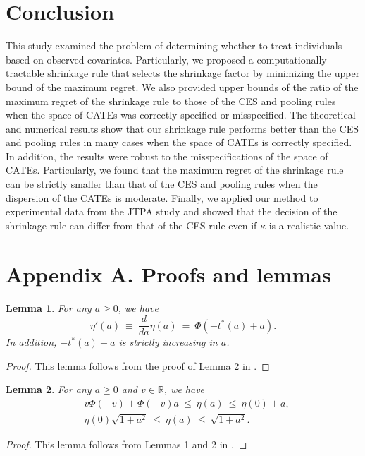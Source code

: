 \documentclass[12pt,a4paper]{article}
\newtheorem{Lemma}{Lemma}
\begin{document}
\section{Conclusion}\label{Sec:conclusion}
This study examined the problem of determining whether to treat individuals based on observed covariates. Particularly, we proposed a computationally tractable shrinkage rule that selects the shrinkage factor by minimizing the upper bound of the maximum regret. We also provided upper bounds of the ratio of the maximum regret of the shrinkage rule to those of the CES and pooling rules when the space of CATEs was correctly specified or misspecified. The theoretical and numerical results show that our shrinkage rule performs better than the CES and pooling rules in many cases when the space of CATEs is correctly specified. In addition, the results were robust to the misspecifications of the space of CATEs. Particularly, we found that the maximum regret of the shrinkage rule can be strictly smaller than that of the CES and pooling rules when the dispersion of the CATEs is moderate. Finally, we applied our method to experimental data from the JTPA study and showed that the decision of the shrinkage rule can differ from that of the CES rule even if $\kappa$ is a realistic value.

\clearpage

\renewcommand{\theequation}{A.\arabic{equation}}
\setcounter{equation}{0}
\section*{Appendix A. Proofs and lemmas}\label{Sec:appendix_proof}

\begin{Lemma}\label{lem:eta_derivative}
For any $a \geq 0$, we have
$$
\eta'(a) \ \equiv \ \frac{d}{da} \eta(a) \ = \ \Phi(-t^*(a) + a).
$$
In addition, $-t^*(a) + a$ is strictly increasing in $a$.
\end{Lemma}
\begin{proof}
This lemma follows from the proof of Lemma 2 in \cite{ishihara2021evidence}.
\end{proof}\vspace{0.1in}

\begin{Lemma}\label{lem:eta}
For any $a \geq 0$ and $v \in \mathbb{R}$, we have
\begin{eqnarray*}
&  v \Phi(-v) + \Phi(-v) a \ \leq \ \eta(a) \ \leq \ \eta(0) + a, \\
&  \eta(0) \sqrt{1+a^2} \ \leq \ \eta(a) \ \leq \ \sqrt{1+a^2}.
\end{eqnarray*}
\end{Lemma}
\begin{proof}
This lemma follows from Lemmas 1 and 2 in \cite{ishihara2021evidence}.
\end{proof}\vspace{0.1in}
\end{document}
